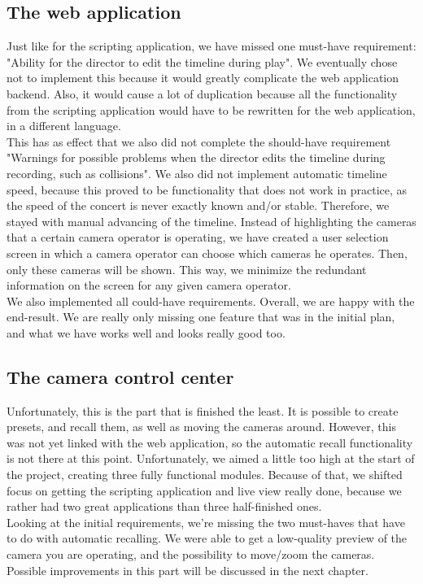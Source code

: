 \subsection*{The web application}
Just like for the scripting application, we have missed one must-have requirement: "Ability for the director to edit the timeline during play". We eventually chose not to implement this because it would greatly complicate the web application backend. Also, it would cause a lot of duplication because all the functionality from the scripting application would have to be rewritten for the web application, in a different language.\\
This has as effect that we also did not complete the should-have requirement "Warnings for possible problems when the director edits the timeline during recording, such as collisions". We also did not implement automatic timeline speed, because this proved to be functionality that does not work in practice, as the speed of the concert is never exactly known and/or stable. Therefore, we stayed with manual advancing of the timeline. Instead of highlighting the cameras that a certain camera operator is operating, we have created a user selection screen in which a camera operator can choose which cameras he operates. Then, only these cameras will be shown. This way, we minimize the redundant information on the screen for any given camera operator.\\
We also implemented all could-have requirements. Overall, we are happy with the end-result. We are really only missing one feature that was in the initial plan, and what we have works well and looks really good too.

\subsection*{The camera control center}
Unfortunately, this is the part that is finished the least. It is possible to create presets, and recall them, as well as moving the cameras around. However, this was not yet linked with the web application, so the automatic recall functionality is not there at this point. Unfortunately, we aimed a little too high at the start of the project, creating three fully functional modules. Because of that, we shifted focus on getting the scripting application and live view really done, because we rather had two great applications than three half-finished ones.\\
Looking at the initial requirements, we're missing the two must-haves that have to do with automatic recalling. We were able to get a low-quality preview of the camera you are operating, and the possibility to move/zoom the cameras.\\
Possible improvements in this part will be discussed in the next chapter.

